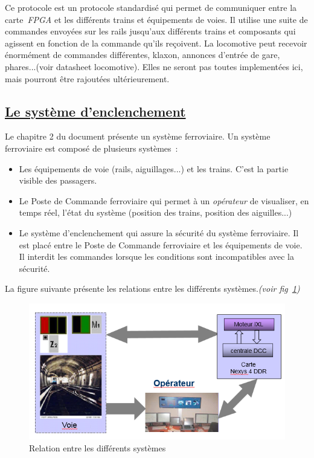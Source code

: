 Ce protocole est un protocole standardis\'e qui permet de communiquer
entre la carte~\emph{FPGA} et les diff\'erents trains et
équipements de voies.
Il utilise une suite de commandes envoy\'ees sur les rails
jusqu'aux diff\'erents trains et composants qui agissent en fonction de
la commande qu'ils reçoivent.
La locomotive peut recevoir \'enormément de commandes différentes,
klaxon, annonces d'entr\'ee de gare, phares...(voir datasheet
locomotive). Elles ne seront pas toutes implement\'ees ici, mais
pourront \^etre rajout\'ees ult\'erieurement. 


\subsection{\underline{Le système d'enclenchement}}
\label{sec:log_ixl}

Le chapitre 2 du document \cite{sun2015} présente un système
ferroviaire. Un système ferroviaire est compos\'e de plusieurs systèmes~:
\begin{itemize}
  \item Les \'equipements de voie (rails, aiguillages...) et les
    trains. C'est la partie visible des passagers. 
  \item Le Poste de Commande ferroviaire qui permet à un \emph{op\'erateur} de
    visualiser, en temps r\'eel, l'\'etat du système (position des trains,
    position des aiguilles...)
  \item Le système d'enclenchement qui assure la s\'ecurit\'e du système
    ferroviaire. Il est plac\'e entre le Poste de Commande ferroviaire
    et les \'equipements de voie. Il interdit les commandes lorsque les
    conditions sont incompatibles avec la s\'ecurit\'e. 
\end{itemize}

La figure suivante pr\'esente les relations entre les diff\'erents
systèmes.\emph{(voir fig~\ref{fig3})}

\begin{figure}[h]
\centering
\includegraphics[scale=0.50]{sys_ferro.png}
\caption{Relation entre les différents systèmes}
\label{fig3}
\end{figure}

